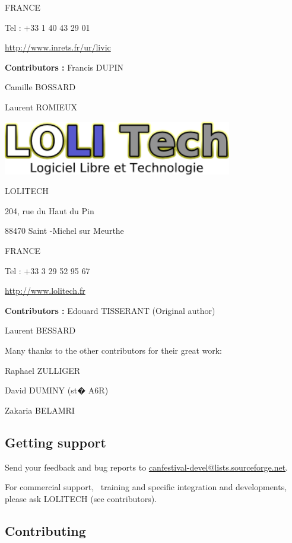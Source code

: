 \documentclass[12pt,english,a4paper]{book}
\begin{document}
FRANCE

Tel : +33 1 40 43 29 01

\href{http://www.inrets.fr/ur/livic}{http://www.inrets.fr/ur/livic}

\textbf{Contributors :} Francis DUPIN

Camille BOSSARD

Laurent ROMIEUX

\bigskip{}


\begin{center}
\includegraphics[width=10cm]{Pictures/100002010000013A0000004A96B0C1FF} 
\par\end{center}

LOLITECH

204, rue du Haut du Pin

88470 Saint -Michel sur Meurthe

FRANCE

Tel : +33 3 29 52 95 67

\href{http://www.lolitech.fr/}{http://www.lolitech.fr}

\textbf{Contributors :} Edouard TISSERANT (Original author)

Laurent BESSARD

\bigskip{}


Many thanks to the other contributors for their great work:

Raphael ZULLIGER

David DUMINY (st� A6R)

Zakaria BELAMRI


\subsection{Getting support}

Send your feedback and bug reports to \href{mailto:canfestival-devel@lists.sourceforge.net}{canfestival-devel@lists.sourceforge.net}.

For commercial support, \ training and specific integration and developments,
please ask LOLITECH (see contributors).


\subsection{Contributing}
\end{document}
